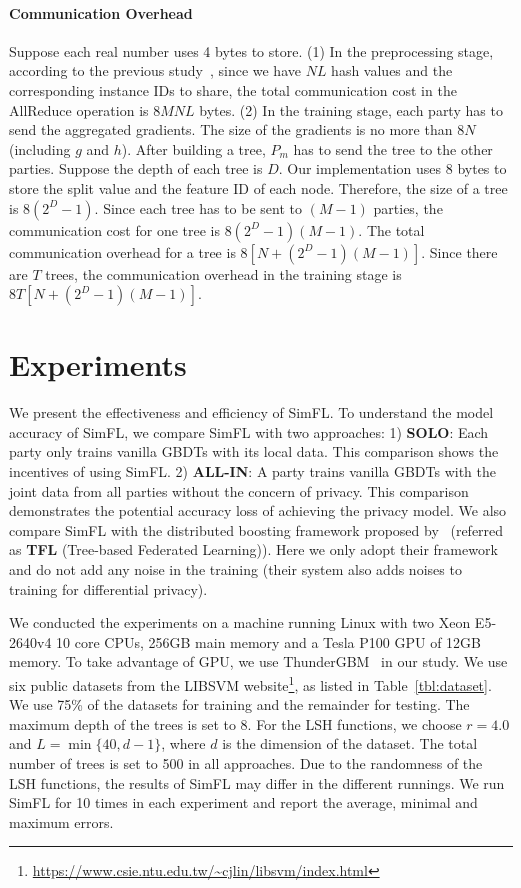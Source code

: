 \documentclass[letterpaper]{article} %
\theoremstyle{definition}
\newcommand{\citet}[1]{\citeauthor{#1} \shortcite{#1}}
\begin{document}
\paragraph{Communication Overhead} Suppose each real number uses 4 bytes to store. (1) In the preprocessing stage, according to the previous study~\cite{patarasuk2009bandwidth}, since we have $NL$ hash values and the corresponding instance IDs to share, the total communication cost in the AllReduce operation is $8MNL$ bytes. (2) In the training stage, each party has to send the aggregated gradients. The size of the gradients is no more than $8N$ (including $g$ and $h$). After building a tree, $P_m$ has to send the tree to the other parties. Suppose the depth of each tree is $D$. Our implementation uses 8 bytes to store the split value and the feature ID of each node. Therefore, the size of a tree is $8(2^D-1)$. Since each tree has to be sent to $(M-1)$ parties, the communication cost for one tree is $8(2^D-1)(M-1)$. The total communication overhead for a tree is $8[N +(2^D-1)(M-1)]$. Since there are $T$ trees, the communication overhead in the training stage is $8T[N +(2^D-1)(M-1)]$.

\section{Experiments}
We present the effectiveness and efficiency of SimFL. To understand the model accuracy of SimFL, we compare SimFL with two approaches: 1) {\bf SOLO}: Each party only trains vanilla GBDTs with its local data. This comparison shows the incentives of using SimFL. 2) {\bf ALL-IN}: A party trains vanilla GBDTs with the joint data from all parties without the concern of privacy. This comparison demonstrates the potential accuracy loss of achieving the privacy model. We also compare SimFL with the distributed boosting framework proposed by~\citet{zhao2018inprivate} (referred as {\bf TFL} (Tree-based Federated Learning)). Here we only adopt their framework and do not add any noise in the training (their system also adds noises to training for differential privacy).

We conducted the experiments on a machine running Linux with two Xeon E5-2640v4 10 core CPUs, 256GB main memory and a Tesla P100 GPU of 12GB memory. To take advantage of GPU, we use ThunderGBM~\cite{ThunderGBM} in our study. We use six public datasets from the LIBSVM website\footnote{\url{https://www.csie.ntu.edu.tw/~cjlin/libsvm/index.html}}, as listed in Table~\ref{tbl:dataset}. We use 75\% of the datasets for training and the remainder for testing. The maximum depth of the trees is set to 8. For the LSH functions, we choose $r = 4.0$ and $L=\min\{40, d-1\}$, where $d$ is the dimension of the dataset. The total number of trees is set to 500 in all approaches. Due to the randomness of the LSH functions, the results of SimFL may differ in the different runnings. We run SimFL for 10 times in each experiment and report the average, minimal and maximum errors.
\end{document}
